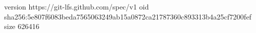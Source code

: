 version https://git-lfs.github.com/spec/v1
oid sha256:5e807f6083beda7565063249ab15a0872ca21787360c893313b4a25cf7200fef
size 626416
